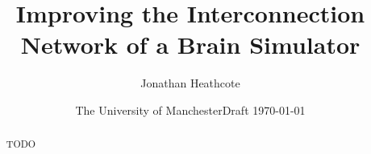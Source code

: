 \documentclass[a4paper,12pt,titlepage]{report}
\title{Improving the Interconnection Network of a Brain Simulator}
\author{Jonathan Heathcote}
\date{The University of Manchester}
\date{Draft \today}
\begin{document}
	
	\maketitle
	
	\begin{abstract}
		
		TODO
		
	\end{abstract}
	
	\tableofcontents
	\listoffigures
	\listoftables
	
	
	
	
	
	
	
	
	
	
\end{document}

